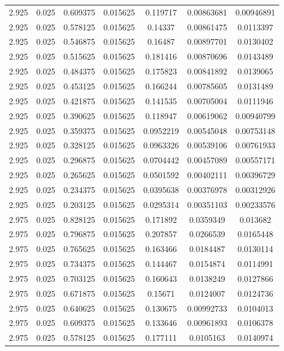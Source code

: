 \begin{flushleft}
\begin{longtable}{ccccccc}
2.925 & 0.025 & 0.609375 & 0.015625 & 0.119717 & 0.00863681 & 0.00946891  \\ 
2.925 & 0.025 & 0.578125 & 0.015625 & 0.14337 & 0.00861475 & 0.0113397  \\ 
2.925 & 0.025 & 0.546875 & 0.015625 & 0.16487 & 0.00897701 & 0.0130402  \\ 
2.925 & 0.025 & 0.515625 & 0.015625 & 0.181416 & 0.00870696 & 0.0143489  \\ 
2.925 & 0.025 & 0.484375 & 0.015625 & 0.175823 & 0.00841892 & 0.0139065  \\ 
2.925 & 0.025 & 0.453125 & 0.015625 & 0.166244 & 0.00785605 & 0.0131489  \\ 
2.925 & 0.025 & 0.421875 & 0.015625 & 0.141535 & 0.00705004 & 0.0111946  \\ 
2.925 & 0.025 & 0.390625 & 0.015625 & 0.118947 & 0.00619062 & 0.00940799  \\ 
2.925 & 0.025 & 0.359375 & 0.015625 & 0.0952219 & 0.00545048 & 0.00753148  \\ 
2.925 & 0.025 & 0.328125 & 0.015625 & 0.0963326 & 0.00539106 & 0.00761933  \\ 
2.925 & 0.025 & 0.296875 & 0.015625 & 0.0704442 & 0.00457089 & 0.00557171  \\ 
2.925 & 0.025 & 0.265625 & 0.015625 & 0.0501592 & 0.00402111 & 0.00396729  \\ 
2.925 & 0.025 & 0.234375 & 0.015625 & 0.0395638 & 0.00376978 & 0.00312926  \\ 
2.925 & 0.025 & 0.203125 & 0.015625 & 0.0295314 & 0.00351103 & 0.00233576  \\ 
2.975 & 0.025 & 0.828125 & 0.015625 & 0.171892 & 0.0359349 & 0.013682  \\ 
2.975 & 0.025 & 0.796875 & 0.015625 & 0.207857 & 0.0266539 & 0.0165448  \\ 
2.975 & 0.025 & 0.765625 & 0.015625 & 0.163466 & 0.0184487 & 0.0130114  \\ 
2.975 & 0.025 & 0.734375 & 0.015625 & 0.144467 & 0.0154874 & 0.0114991  \\ 
2.975 & 0.025 & 0.703125 & 0.015625 & 0.160643 & 0.0138249 & 0.0127866  \\ 
2.975 & 0.025 & 0.671875 & 0.015625 & 0.15671 & 0.0124007 & 0.0124736  \\ 
2.975 & 0.025 & 0.640625 & 0.015625 & 0.130675 & 0.00992733 & 0.0104013  \\ 
2.975 & 0.025 & 0.609375 & 0.015625 & 0.133646 & 0.00961893 & 0.0106378  \\ 
2.975 & 0.025 & 0.578125 & 0.015625 & 0.177111 & 0.0105163 & 0.0140974  \\ 

\end{longtable}
\end{flushleft}
